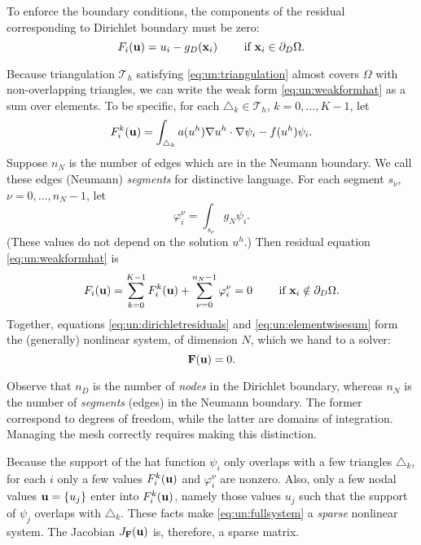To enforce the boundary conditions, the components of the residual corresponding to Dirichlet boundary must be zero:
\begin{equation}
F_i(\mathbf{u}) = u_i - g_D(\mathbf{x}_i) \qquad \text{ if } \mathbf{x}_i \in \partial_D\Omega.  \label{eq:un:dirichletresiduals}
\end{equation}

Because triangulation $\mathcal{T}_h$ satisfying \eqref{eq:un:triangulation} almost covers $\Omega$ with non-overlapping triangles, we can write the weak form \eqref{eq:un:weakformhat} as a sum over elements.  To be specific, for each $\triangle_k \in \mathcal{T}_h$, $k=0,\dots,K-1$, let
\begin{equation}
F_i^k(\mathbf{u}) = \int_{\triangle_k} a(u^h) \nabla u^h \cdot \nabla \psi_i - f(u^h) \psi_i.  \label{eq:un:elementweakform}
\end{equation}
Suppose $n_N$ is the number of edges which are in the Neumann boundary.  We call these edges (Neumann) \emph{segments} for distinctive language.  For each segment $s_\nu$, $\nu=0,\dots,n_N-1$, let
\begin{equation}
\varphi_i^\nu = \int_{s_\nu} g_N \psi_i.  \label{eq:un:segmentweakform}
\end{equation}
(These values do not depend on the solution $u^h$.)  Then residual equation \eqref{eq:un:weakformhat} is
\begin{equation}
F_i(\mathbf{u}) = \sum_{k=0}^{K-1} F_i^k(\mathbf{u}) + \sum_{\nu=0}^{n_N-1} \varphi_i^\nu = 0  \qquad \text{ if } \mathbf{x}_i \notin \partial_D\Omega. \label{eq:un:elementwisesum}
\end{equation}
Together, equations \eqref{eq:un:dirichletresiduals} and \eqref{eq:un:elementwisesum} form the (generally) nonlinear system, of dimension $N$, which we hand to a \pSNES solver:
\begin{equation}
\mathbf{F}(\mathbf{u})=0. \label{eq:un:fullsystem}
\end{equation}

Observe that $n_D$ is the number of \emph{nodes} in the Dirichlet boundary, whereas $n_N$ is the number of \emph{segments} (edges) in the Neumann boundary.  The former correspond to degrees of freedom, while the latter are domains of integration.  Managing the mesh correctly requires making this distinction.

Because the support of the hat function $\psi_i$ only overlaps with a few triangles $\triangle_k$, for each $i$ only a few values $F_i^k(\mathbf{u})$ and $\varphi_i^\nu$ are nonzero.  Also, only a few nodal values $\mathbf{u}=\{u_j\}$ enter into $F_i^k(\mathbf{u})$, namely those values $u_j$ such that the support of $\psi_j$ overlaps with $\triangle_k$.  These facts make \eqref{eq:un:fullsystem} a \emph{sparse} nonlinear system.  The Jacobian $J_{\mathbf{F}}(\mathbf{u})$ is, therefore, a sparse matrix.

